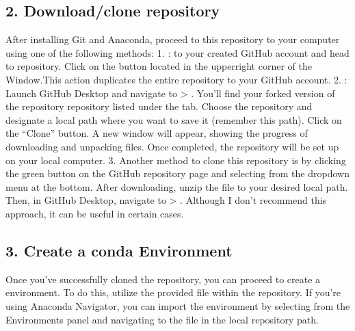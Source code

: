 \documentclass[letterpaper,10pt,english]{sphinxmanual}
\begin{document}
\subsection{2. Download/clone repository}
\label{\detokenize{egm722_serenee/NI_Tourist_Map_doc:download-clone-repository}}
\sphinxAtStartPar
After installing Git and Anaconda, proceed to  this repository to your computer using one of the following methods:
1.  :  to your created GitHub account and head to  repository. Click on the  button located in the upper\sphinxhyphen{}right corner of the Window.This action duplicates the entire repository to your GitHub account.
2.  : Launch GitHub Desktop and navigate to  > . You’ll find your forked version of the  repository repository listed under the  tab. Choose the repository and designate a local path where you want to save it (remember this path). Click on the “Clone” button. A new window will appear, showing the progress of downloading and unpacking files. Once completed, the repository will be set up on your local computer.
3. Another method to clone this repository is by clicking the green  button on the GitHub repository page and selecting  from the dropdown menu at the bottom. After downloading, unzip the file to your desired local path. Then, in GitHub Desktop, navigate to  > . Although I don’t recommend this approach, it can be useful in certain cases.


\subsection{3. Create a conda Environment}
\label{\detokenize{egm722_serenee/NI_Tourist_Map_doc:create-a-conda-environment}}
\sphinxAtStartPar
Once you’ve successfully cloned the repository, you can proceed to create a  environment. To do this, utilize the provided  file within the repository. If you’re using Anaconda Navigator, you can import the environment by selecting  from the Environments panel and navigating to the  file in the local repository path.
\end{document}
